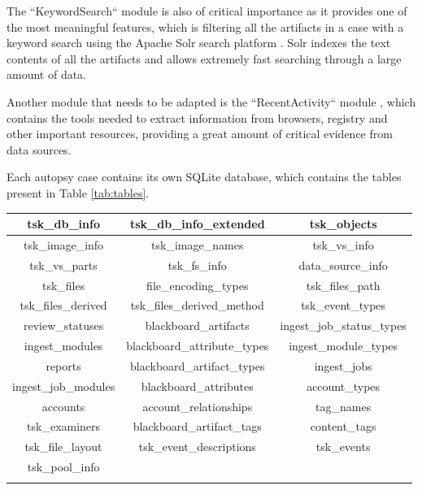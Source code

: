 The ``KeywordSearch`` module \cite{keyword} is also of critical importance as it provides one of the most meaningful features, which is filtering all the artifacts in a case with a keyword
search using the Apache Solr search platform \cite{solr}. Solr indexes the text contents of all the artifacts and allows extremely fast searching through a large amount of data.  

Another module that needs to be adapted is the ``RecentActivity`` module \cite{recent}, which contains the tools needed to extract information from browsers, registry and other important resources, providing a great amount of
critical evidence from data sources.

Each autopsy case contains its own SQLite \cite{sqlite} database, which contains the tables present in Table \ref{tab:tables}.

\begin{tabularx}{\textwidth}{|c|c|c|}
    \hline
    tsk\_db\_info & tsk\_db\_info\_extended & {\color{teal}tsk\_objects} \\
    \hline
    {\color{teal}tsk\_image\_info} & {\color{teal}tsk\_image\_names} & {\color{teal}tsk\_vs\_info} \\
    \hline
    {\color{teal}tsk\_vs\_parts} & {\color{teal}tsk\_fs\_info} & {\color{teal}data\_source\_info} \\
    \hline
    {\color{teal}tsk\_files} & {\color{teal}file\_encoding\_types} & {\color{teal}tsk\_files\_path} \\
    \hline
    {\color{teal}tsk\_files\_derived} & {\color{teal}tsk\_files\_derived\_method} & tsk\_event\_types \\
    \hline
    review\_statuses & {\color{violet}blackboard\_artifacts} & ingest\_job\_status\_types \\
    \hline
    ingest\_modules & {\color{violet}blackboard\_attribute\_types} & ingest\_module\_types \\
    \hline
    reports & {\color{violet}blackboard\_artifact\_types} & ingest\_jobs \\
    \hline
    ingest\_job\_modules & {\color{violet}blackboard\_attributes} & account\_types \\
    \hline
    accounts & account\_relationships & {\color{blue}tag\_names} \\
    \hline
    {\color{blue}tsk\_examiners} & {\color{blue}blackboard\_artifact\_tags} & {\color{blue}content\_tags} \\
    \hline
    tsk\_file\_layout & tsk\_event\_descriptions & tsk\_events \\
    \hline
    tsk\_pool\_info & & \\
    \hline
    \caption{Case Database Tables}
    \label{tab:tables}
\end{tabularx}


